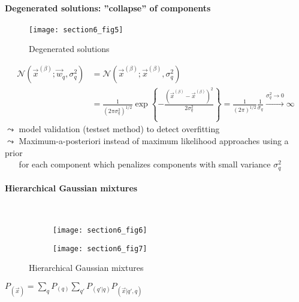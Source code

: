 \paragraph{Degenerated solutions: ''collapse'' of components}
\begin{figure}[h]
	\centering
	\texttt{[image: section6\_fig5]}
	\caption{Degenerated solutions}
\end{figure}
\small
\begin{align*}
\mathcal{N}(\vec{x}^{(\beta)}; \vec{w}_{q}, \sigma_q^2) &= \mathcal{N}(\vec{x}^{(\beta)}; \vec{x}^{(\beta)}, \sigma_q^2) 
\\&= \frac{1}{\left( 2\pi \sigma_q^2 \right)^{1/2}} \exp \left\{ - \frac{\left( \vec{x}^{(\beta)} -\vec{x}^{(\beta)} \right)^2}{2 \sigma_q^2} \right\} = \frac{1}{(2\pi)^{1/2}} \frac{1}{\sigma_q} \stackrel{\sigma_q^2 \rightarrow 0}{\longrightarrow} \infty
\end{align*}
$\leadsto$ model validation (testset method) to detect overfitting \\
$\leadsto$ Maximum-a-posteriori instead of maximum likelihood approaches using a prior\\
$\phantom{\leadsto}$ for each component which penalizes components with small variance $\sigma_q^2$
\paragraph{Hierarchical Gaussian mixtures}\mbox{}\\
\begin{figure}[h]
    \centering
    \begin{subfigure}[b]{0.48\textwidth}
        \texttt{[image: section6\_fig6]}
    \end{subfigure}
    \begin{subfigure}[b]{0.48\textwidth}
        \texttt{[image: section6\_fig7]}
    \end{subfigure}
    \caption{Hierarchical Gaussian mixtures}
\end{figure}
\begin{center}
\vspace{0.5cm}
$P_{(\vec{x})} = \sum_{q}^{} P_{(q)} \sum_{q'}^{} P_{(q' | q)} P_{(\vec{x} | q', q)}$
\end{center}
